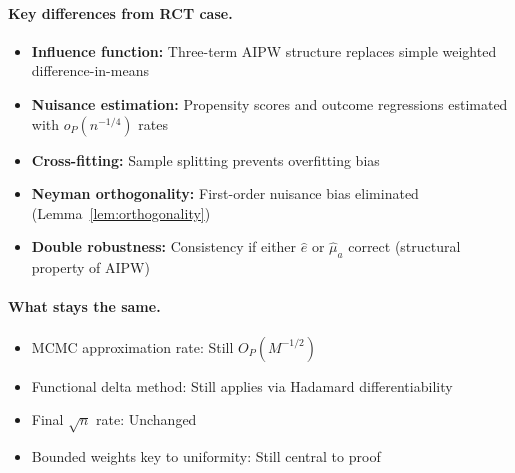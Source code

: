 \paragraph{Key differences from RCT case.}
\begin{itemize}
\item \textbf{Influence function:} Three-term AIPW structure replaces simple weighted difference-in-means
\item \textbf{Nuisance estimation:} Propensity scores and outcome regressions estimated with $o_P(n^{-1/4})$ rates
\item \textbf{Cross-fitting:} Sample splitting prevents overfitting bias
\item \textbf{Neyman orthogonality:} First-order nuisance bias eliminated (Lemma~\ref{lem:orthogonality})
\item \textbf{Double robustness:} Consistency if either $\hat{e}$ or $\hat{\mu}_a$ correct (structural property of AIPW)
\end{itemize}

\paragraph{What stays the same.}
\begin{itemize}
\item MCMC approximation rate: Still $O_P(M^{-1/2})$
\item Functional delta method: Still applies via Hadamard differentiability
\item Final $\sqrt{n}$ rate: Unchanged
\item Bounded weights key to uniformity: Still central to proof
\end{itemize}

